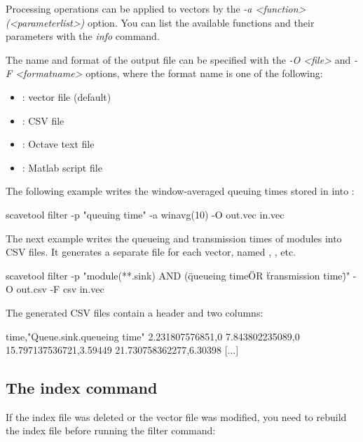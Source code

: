 Processing operations can be applied to vectors by the
\textit{-a <function>(<parameterlist>)} option. You can list
the available functions and their parameters with the \textit{info} command.

The name and format of the output file can be specified with the
\textit{-O <file>} and \textit{-F <formatname>} options, where
the format name is one of the following:

\begin{itemize}
    \item{}: vector file (default)
    \item{}: CSV file
    \item{}: Octave text file
    \item{}: Matlab script file
\end{itemize}

The following example writes the window-averaged queuing times stored
in  into :

\begin{commandline}
scavetool filter -p "queuing time" -a winavg(10) -O out.vec in.vec
\end{commandline}

The next example writes the queueing and transmission times of 
modules into CSV files. It generates a separate file for each vector,
named , , etc.

\begin{commandline}
scavetool filter -p "module(**.sink) AND
                    (\"queueing time\" OR \"transmission time\")"
                 -O out.csv -F csv in.vec
\end{commandline}

The generated CSV files contain a header and two columns:

\begin{filelisting}
time,"Queue.sink.queueing time"
2.231807576851,0
7.843802235089,0
15.797137536721,3.59449
21.730758362277,6.30398
[...]
\end{filelisting}


\subsection{The index command}

If the index file was deleted or the vector file was modified, you need to
rebuild the index file before running the filter command:

